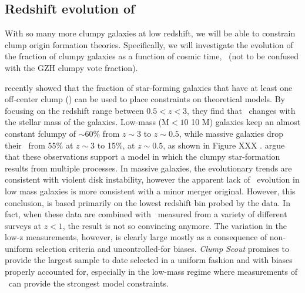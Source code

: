 \subsection{Redshift evolution of \fclump}
With so many more clumpy galaxies at low redshift, we will be able to constrain clump origin formation theories. Specifically, we will investigate the evolution of the fraction of clumpy galaxies as a function of cosmic time, \fclump~(not to be confused with the GZH clumpy vote fraction). 

\cite{Guo2015} recently showed that the fraction of star-forming galaxies that have at least one off-center clump (\fclump) can be used to place constraints on theoretical models. By focusing on the redshift range between $0.5 <z<3$, they find that \fclump~changes with the stellar mass of the galaxies. Low-mass (M$<10$ 10 M) galaxies keep an almost constant fclumpy of $\sim$60\% from $z\sim3$ to $z\sim0.5$, while massive galaxies drop their \fclump~from 55\% at $z\sim3$ to 15\%, at $z\sim0.5$, as shown in Figure XXX \citep[adapted from][]{Guo2015}. \cite{Guo2015} argue that these observations support a model in which the clumpy star-formation results from multiple processes. In massive galaxies, the evolutionary trends are consistent with violent disk instability, however the apparent lack of \fclump~evolution in low mass galaxies is more consistent with a minor merger original. However, this conclusion, is based primarily on the lowest redshift bin probed by the \cite{Guo2015} data. In fact, when these data are combined with \fclump~measured from a variety of different surveys at $z<1$, the result is not so convincing anymore. The variation in the low-z measurements, however, is clearly large mostly as a consequence of non-uniform selection criteria and uncontrolled-for biases. \textit{Clump Scout} promises to provide the largest sample to date selected in a uniform fashion and with biases properly accounted for, especially in the low-mass regime where measurements of \fclump~can provide the strongest model constraints.



